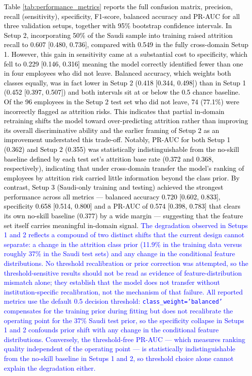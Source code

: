 \documentclass[a4paper,fleqn]{cas-sc}
\begin{document}
\textcolor{black}{Table \ref{tab:performance_metrics} reports the full confusion matrix, precision, recall (sensitivity), specificity, F1-score, balanced accuracy and PR-AUC for all three validation setups, together with 95\% bootstrap confidence intervals. In Setup 2, incorporating 50\% of the Saudi sample into training raised attrition recall to 0.607 [0.480, 0.736], compared with 0.549 in the fully cross-domain Setup 1. However, this gain in sensitivity came at a substantial cost to specificity, which fell to 0.229 [0.146, 0.316] meaning the model correctly identified fewer than one in four employees who did not leave. Balanced accuracy, which weights both classes equally, was in fact lower in Setup 2 (0.418 [0.344, 0.498]) than in Setup 1 (0.452 [0.397, 0.507]) and both intervals sit at or below the 0.5 chance baseline. Of the 96 employees in the Setup 2 test set who did not leave, 74 (77.1\%) were incorrectly flagged as attrition risks. This indicates that partial in-domain retraining shifts the model toward over-predicting attrition rather than improving its overall discriminative ability and the earlier framing of Setup 2 as an improvement understated this trade-off. Notably, PR-AUC for both Setup 1 (0.362) and Setup 2 (0.355) was statistically indistinguishable from the no-skill baseline defined by each test set's attrition base rate (0.372 and 0.368, respectively), indicating that under cross-domain transfer the model's ranking of employees by attrition risk carried little information beyond the class prior. By contrast, Setup 3 (Saudi-only training and testing) achieved the strongest performance across all metrics — balanced accuracy 0.720 [0.602, 0.833], specificity 0.658 [0.514, 0.800] and a PR-AUC of 0.574 [0.398, 0.783] that clears its own no-skill baseline (0.377) by a wide margin — suggesting that the feature set itself carries meaningful in-domain signal. \textcolor{blue}{The degradation observed in Setups 1 and 2 reflects a compound of two distinct shifts that the current design cannot separate: a change in the attrition class prior (11.9\% in the training data versus roughly 37\% in the Saudi test sets) and any change in the conditional feature distributions. No threshold recalibration or prior correction was attempted, so the threshold-sensitive results should not be read as evidence of feature-distribution mismatch alone; they establish that the model does not transfer without institution-specific recalibration, not the mechanism of that failure.} \textcolor{blue}{All reported metrics use the default 0.5 decision threshold: \texttt{class\_weight='balanced'} compensates for the training prior during fitting but does not recalibrate the operating point for the 37\% Saudi test prior, so the specificity collapse in Setups 1 and 2 confounds prior shift with any change in the conditional feature distributions. Conversely, the threshold-free PR-AUC --- which measures ranking quality independent of the operating point --- is statistically indistinguishable from the no-skill baseline in Setups 1 and 2, so threshold choice alone cannot explain the degradation either.}}
\end{document}
